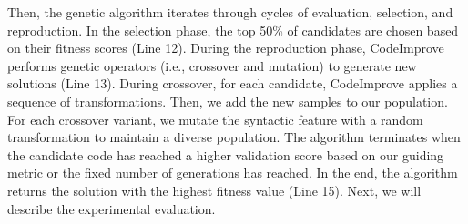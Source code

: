 Then, the genetic algorithm iterates through cycles of evaluation, selection, and reproduction.  In the selection phase, the top 50\% of candidates are chosen based on their fitness scores (Line 12). During the reproduction phase, CodeImprove performs genetic operators (i.e., crossover and mutation) to generate new
solutions (Line 13). During crossover, for each candidate, CodeImprove applies a sequence of transformations. %
Then, we add the new samples to our population. For each crossover variant, we mutate the syntactic feature with a random transformation to maintain a diverse population. The algorithm terminates when the candidate code has reached a higher validation score based on our guiding metric or the fixed number of generations has reached. In the end, the algorithm returns the solution with the highest
fitness value (Line 15). %
Next, we will describe the experimental evaluation.






 














